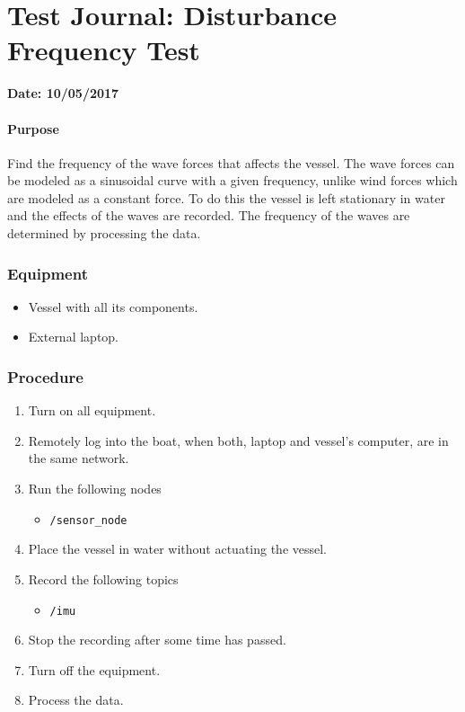 \chapter{Test Journal: Disturbance Frequency Test} \label{app:Disturbance}

\textbf{Date: 10/05/2017}

\subsubsection*{Purpose}
Find the frequency of the wave forces that affects the vessel. The wave forces can be modeled as a sinusoidal curve with a given frequency, unlike wind forces which are modeled as a constant force. To do this the vessel is left stationary in water and the effects of the waves are recorded. The frequency of the waves are determined by processing the data.

\subsection*{Equipment}
\begin{itemize}
    \item Vessel with all its components. 
    \item External laptop.
\end{itemize}

\subsection*{Procedure}
\begin{enumerate}
    \item Turn on all equipment.
    \item Remotely log into the boat, when both, laptop and vessel's computer, are in the same network.
    \item Run the following nodes
    \begin{itemize}
        \item \lstinline[style=cinline]{/sensor_node}
    \end{itemize}
    \item Place the vessel in water without actuating the vessel.
    \item Record the following topics
    \begin{itemize}
        \item \lstinline[style=cinline]{/imu}      
    \end{itemize}
    \item Stop the recording after some time has passed.
    \item Turn off the equipment.
    \item Process the data.
\end{enumerate}

